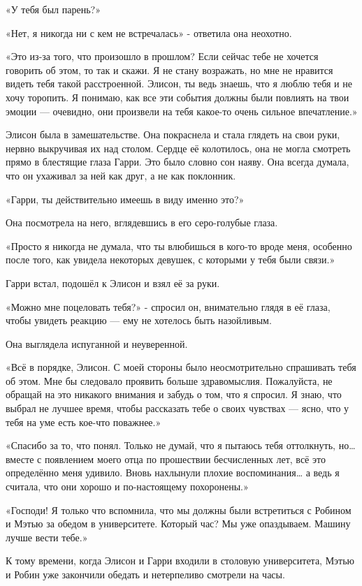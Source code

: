 \documentclass[a5paper, 9pt,
final, openany, twoside=true]{memoir}
\begin{document}
«У тебя был парень?»

«Нет, я никогда ни с кем не встречалась» - ответила она неохотно.

«Это из-за того, что произошло в прошлом? Если сейчас тебе не хочется говорить об этом, то так и скажи. Я не стану возражать, но мне не нравится видеть тебя такой расстроенной. Элисон, ты ведь знаешь, что я люблю тебя и не хочу торопить. Я понимаю, как все эти события должны были повлиять на твои эмоции — очевидно, они произвели на тебя какое-то очень сильное впечатление.»

Элисон была в замешательстве. Она покраснела и стала глядеть на свои руки, нервно выкручивая их над столом. Сердце её колотилось, она не могла смотреть прямо в блестящие глаза Гарри. Это было словно сон наяву. Она всегда думала, что он ухаживал за ней как друг, а не как поклонник.

«Гарри, ты действительно имеешь в виду именно это?»

Она посмотрела на него, вглядевшись в его серо-голубые глаза.

«Просто я никогда не думала, что ты влюбишься в кого-то вроде меня, особенно после того, как увидела некоторых девушек, с которыми у тебя были связи.»

Гарри встал, подошёл к Элисон и взял её за руки.

«Можно мне поцеловать тебя?» - спросил он, внимательно глядя в её глаза, чтобы увидеть реакцию — ему не хотелось быть назойливым.

Она выглядела испуганной и неуверенной.

«Всё в порядке, Элисон. С моей стороны было неосмотрительно спрашивать тебя об этом. Мне бы следовало проявить больше здравомыслия. Пожалуйста, не обращай на это никакого внимания и забудь о том, что я спросил. Я знаю, что выбрал не лучшее время, чтобы рассказать тебе о своих чувствах — ясно, что у тебя на уме есть кое-что поважнее.»

«Спасибо за то, что понял. Только не думай, что я пытаюсь тебя оттолкнуть, но… вместе с появлением моего отца по прошествии бесчисленных лет, всё это определённо меня удивило. Вновь нахлынули плохие воспоминания… а ведь я считала, что они хорошо и по-настоящему похоронены.»

«Господи! Я только что вспомнила, что мы должны были встретиться с Робином и Мэтью за обедом в университете. Который час? Мы уже опаздываем. Машину лучше вести тебе.»\bigskip

К тому времени, когда Элисон и Гарри входили в столовую университета, Мэтью и Робин уже закончили обедать и нетерпеливо смотрели на часы.
\end{document}
